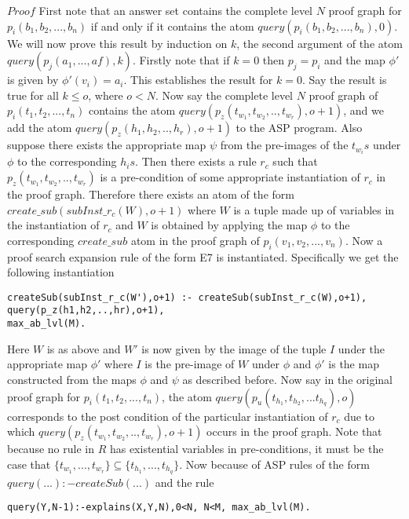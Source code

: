 $\textit{Proof}$ First note that an answer set contains the complete level $N$ proof graph for $p_{i}(b_{1},b_{2},...,b_{n})$ if and only if it contains the atom $query(p_{i}(b_{1},b_{2},...,b_{n}),0)$. We will now prove this result by induction on $k$, the second argument of the atom $query(p_{j}(a_{1},...,a{f}),k)$. Firstly note that if $k = 0$ then $p_{j} = p_{i}$ and the map $\phi'$ is given by $\phi'(v_{i}) = a_{i}$. This establishes the result for $k=0$.  Say the result is true for all $k\leq o$, where $o<N$. Now say the complete level $N$ proof graph of $p_{i}(t_{1},t_{2},...,t_{n})$ contains the atom $query(p_{z}(t_{w_{1}},t_{w_{2}},..,t_{w_{r}}),o+1)$, and we add the atom $query(p_{z}(h_{1},h_{2},..,h_{r}),o+1)$ to the ASP program. Also suppose there exists the appropriate map $\psi$ from the pre-images of the $t_{w_{i}}s$ under $\phi$ to the corresponding $h_{i}s$. Then there exists a rule $r_{c}$ such that $p_{z}(t_{w_{1}},t_{w_{2}},..,t_{w_{r}})$ is a pre-condition of some appropriate instantiation of $r_{c}$ in the proof graph. Therefore there exists an atom of the form $create\_sub(subInst\_r_{c}(W),o+1)$ where $W$ is a tuple made up of variables in the instantiation of $r_{c}$ and $W$ is obtained by applying the map $\phi$ to the corresponding $create\_sub$ atom in the proof graph of $p_{i}(v_{1},v_{2},...,v_{n})$. Now a proof search expansion rule of the form E7 is instantiated. Specifically we get the following instantiation 
\begin{verbatim}
createSub(subInst_r_c(W'),o+1) :- createSub(subInst_r_c(W),o+1), query(p_z(h1,h2,..,hr),o+1),
max_ab_lvl(M).
\end{verbatim}

Here $W$ is as above and $W'$ is now given by the image of the tuple $I$ under
the appropriate map $\phi'$ where $I$ is the pre-image of $W$ under $\phi$ and
$\phi'$ is the map constructed from the maps $\phi$ and $\psi$ as described
before. Now say in the original proof graph for
$p_{i}(t_{1},t_{2},...,t_{n})$, the atom
$query(p_{u}(t_{h_{1}},t_{h_{2}},...t_{h_{q}}),o)$ corresponds to the post
condition of the particular instantiation of $r_{c}$ due to which
$query(p_{z}(t_{w_{1}},t_{w_{2}},..,t_{w_{r}}),o+1)$ occurs in the proof
graph. Note that because no rule in $R$ has existential variables in
pre-conditions, it must be the case that
$\{t_{w_{1}},...,t_{w_{r}}\}\subseteq\{t_{h_{1}},...,t_{h_{q}}\}$. Now because
of ASP rules of the form $query(...):-createSub(...)$ and the rule
\begin{verbatim}
query(Y,N-1):-explains(X,Y,N),0<N, N<M, max_ab_lvl(M).    
\end{verbatim}

